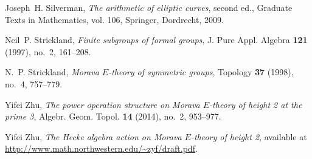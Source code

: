 \documentclass{rs}
\theoremstyle{definition}
\theoremstyle{remark}
\renewcommand{\=}{\approx}
\renewcommand{\-}{\sim}
\numberwithin{equation}{section}
\begin{document}
\begin{thebibliography}
Joseph~H. Silverman, \emph{The arithmetic of elliptic curves}, second ed.,
  Graduate Texts in Mathematics, vol. 106, Springer, Dordrecht, 2009.

Neil~P. Strickland, \emph{Finite subgroups of formal groups}, J. Pure Appl.
  Algebra \textbf{121} (1997), no.~2, 161--208. 

N.~P. Strickland, \emph{Morava {$E$}-theory of symmetric groups}, Topology
  \textbf{37} (1998), no.~4, 757--779. 

Yifei Zhu, \emph{The power operation structure on {M}orava {$E$}-theory of
  height 2 at the prime 3}, Algebr. Geom. Topol. \textbf{14} (2014), no.~2,
  953--977. 

Yifei Zhu, \emph{The {H}ecke algebra action on {M}orava {$E$}-theory of height
  2}, available at \\ \href{http://www.math.northwestern.edu/~zyf/draft.pdf}
  {http://www.math.northwestern.edu/\textasciitilde zyf/draft.pdf}.

\end{thebibliography}
\end{document}
